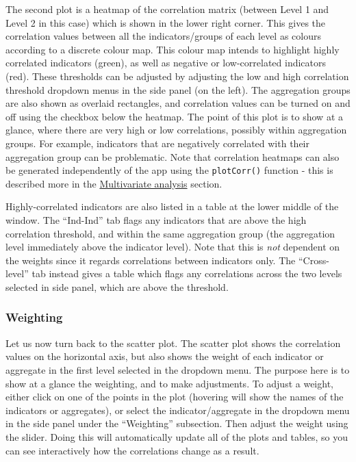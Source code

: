 \documentclass[
]{book}
\begin{document}
The second plot is a heatmap of the correlation matrix (between Level 1 and Level 2 in this case) which is shown in the lower right corner. This gives the correlation values between all the indicators/groups of each level as colours according to a discrete colour map. This colour map intends to highlight highly correlated indicators (green), as well as negative or low-correlated indicators (red). These thresholds can be adjusted by adjusting the low and high correlation threshold dropdown menus in the side panel (on the left). The aggregation groups are also shown as overlaid rectangles, and correlation values can be turned on and off using the checkbox below the heatmap. The point of this plot is to show at a glance, where there are very high or low correlations, possibly within aggregation groups. For example, indicators that are negatively correlated with their aggregation group can be problematic. Note that correlation heatmaps can also be generated independently of the app using the \texttt{plotCorr()} function - this is described more in the \protect\hyperlink{multivariate-analysis-1}{Multivariate analysis} section.

Highly-correlated indicators are also listed in a table at the lower middle of the window. The ``Ind-Ind'' tab flags any indicators that are above the high correlation threshold, and within the same aggregation group (the aggregation level immediately above the indicator level). Note that this is \emph{not} dependent on the weights since it regards correlations between indicators only. The ``Cross-level'' tab instead gives a table which flags any correlations across the two levels selected in side panel, which are above the threshold.

\hypertarget{weighting-2}{%
\subsubsection{Weighting}\label{weighting-2}}

Let us now turn back to the scatter plot. The scatter plot shows the correlation values on the horizontal axis, but also shows the weight of each indicator or aggregate in the first level selected in the dropdown menu. The purpose here is to show at a glance the weighting, and to make adjustments. To adjust a weight, either click on one of the points in the plot (hovering will show the names of the indicators or aggregates), or select the indicator/aggregate in the dropdown menu in the side panel under the ``Weighting'' subsection. Then adjust the weight using the slider. Doing this will automatically update all of the plots and tables, so you can see interactively how the correlations change as a result.
\end{document}
